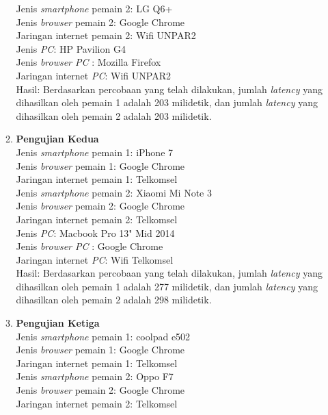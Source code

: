 \begin{enumerate}
\begin{enumerate}
		Jenis \textit{smartphone} pemain 2: LG Q6+\\
		Jenis \textit{browser} pemain 2: Google Chrome\\
		Jaringan internet pemain 2: Wifi UNPAR2\\
		
		Jenis \textit{PC}: HP Pavilion G4\\
		Jenis \textit{browser PC} : Mozilla Firefox\\
		Jaringan internet \textit{PC}: Wifi UNPAR2\\
		
		Hasil: Berdasarkan percobaan yang telah dilakukan, jumlah \textit{latency} yang dihasilkan oleh pemain 1 adalah 203 milidetik, dan jumlah \textit{latency} yang dihasilkan oleh pemain 2 adalah 203 milidetik.
		
		\item \textbf{Pengujian Kedua} \\ 
		Jenis \textit{smartphone} pemain 1: iPhone 7\\
		Jenis \textit{browser} pemain 1: Google Chrome\\
		Jaringan internet pemain 1: Telkomsel\\
		
		Jenis \textit{smartphone} pemain 2: Xiaomi Mi Note 3\\
		Jenis \textit{browser} pemain 2: Google Chrome\\
		Jaringan internet pemain 2: Telkomsel\\
		
		Jenis \textit{PC}: Macbook Pro 13" Mid 2014\\
		Jenis \textit{browser PC} : Google Chrome\\
		Jaringan internet \textit{PC}: Wifi Telkomsel\\
		
		Hasil: Berdasarkan percobaan yang telah dilakukan, jumlah \textit{latency} yang dihasilkan oleh pemain 1 adalah 277 milidetik, dan jumlah \textit{latency} yang dihasilkan oleh pemain 2 adalah 298 milidetik.
		
		\item \textbf{Pengujian Ketiga} \\ 
		Jenis \textit{smartphone} pemain 1: coolpad e502\\
		Jenis \textit{browser} pemain 1: Google Chrome\\
		Jaringan internet pemain 1: Telkomsel\\
		
		Jenis \textit{smartphone} pemain 2: Oppo F7\\
		Jenis \textit{browser} pemain 2: Google Chrome\\
		Jaringan internet pemain 2: Telkomsel\\
		

\end{enumerate}
\end{enumerate}
